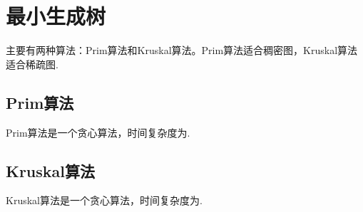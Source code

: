 \newpage
\section{最小生成树}
主要有两种算法：Prim算法和Kruskal算法。Prim算法适合稠密图，Kruskal算法适合稀疏图.
\subsection{Prim算法}
Prim算法是一个贪心算法，时间复杂度为.
\subsection{Kruskal算法}
Kruskal算法是一个贪心算法，时间复杂度为.
